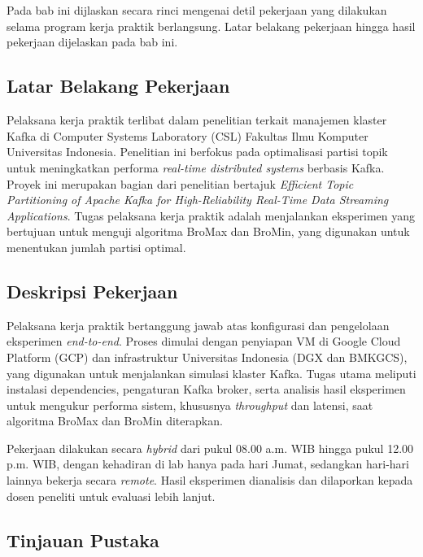\chapter{\babDua}
\label{bab:2}
Pada bab ini dijlaskan secara rinci mengenai detil pekerjaan yang dilakukan selama program kerja praktik berlangsung. Latar belakang pekerjaan hingga hasil pekerjaan dijelaskan pada bab ini.

\section{Latar Belakang Pekerjaan}

Pelaksana kerja praktik terlibat dalam penelitian terkait manajemen klaster Kafka di Computer Systems Laboratory (CSL) Fakultas Ilmu Komputer Universitas Indonesia. Penelitian ini berfokus pada optimalisasi partisi topik untuk meningkatkan performa \textit{real-time distributed systems} berbasis Kafka. Proyek ini merupakan bagian dari penelitian bertajuk \textit{Efficient Topic Partitioning of Apache Kafka for High-Reliability Real-Time Data Streaming Applications}. Tugas pelaksana kerja praktik adalah menjalankan eksperimen yang bertujuan untuk menguji algoritma BroMax dan BroMin, yang digunakan untuk menentukan jumlah partisi optimal.

\section{Deskripsi Pekerjaan}

Pelaksana kerja praktik bertanggung jawab atas konfigurasi dan pengelolaan eksperimen \textit{end-to-end}. Proses dimulai dengan penyiapan VM di Google Cloud Platform (GCP) dan infrastruktur Universitas Indonesia (DGX dan BMKGCS), yang digunakan untuk menjalankan simulasi klaster Kafka. Tugas utama meliputi instalasi dependencies, pengaturan Kafka broker, serta analisis hasil eksperimen untuk mengukur performa sistem, khususnya \textit{throughput} dan latensi, saat algoritma BroMax dan BroMin diterapkan.

Pekerjaan dilakukan secara \textit{hybrid} dari pukul 08.00 a.m. WIB hingga pukul 12.00 p.m. WIB, dengan kehadiran di lab hanya pada hari Jumat, sedangkan hari-hari lainnya bekerja secara \textit{remote}. Hasil eksperimen dianalisis dan dilaporkan kepada dosen peneliti untuk evaluasi lebih lanjut.

\section{Tinjauan Pustaka}

